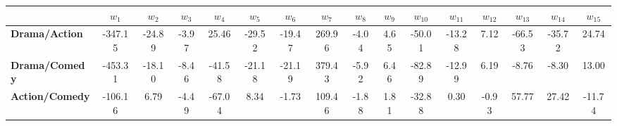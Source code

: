 \begin{tabular}{|l|c|c|c|c|c|c|c|c|c|c|c|c|c|c|c|}
\hline
&\textbf{$w_{1}$}&\textbf{$w_{2}$}&\textbf{$w_{3}$}&\textbf{$w_{4}$}&\textbf{$w_{5}$}&\textbf{$w_{6}$}&\textbf{$w_{7}$}&\textbf{$w_{8}$}&\textbf{$w_{9}$}&\textbf{$w_{10}$}&\textbf{$w_{11}$}&\textbf{$w_{12}$}&\textbf{$w_{13}$}&\textbf{$w_{14}$}&\textbf{$w_{15}$}\\\hline
\textbf{Drama/Action}&-347.15&-24.89&-3.97&25.46&-29.52&-19.47&269.96&-4.04&4.65&-50.01&-13.28&7.12&-66.53&-35.72&24.74\\\hline
\textbf{Drama/Comedy}&-453.31&-18.10&-8.46&-41.58&-21.18&-21.19&379.43&-5.92&6.46&-82.89&-12.99&6.19&-8.76&-8.30&13.00\\\hline
\textbf{Action/Comedy}&-106.16&6.79&-4.49&-67.04&8.34&-1.73&109.46&-1.88&1.81&-32.88&0.30&-0.93&57.77&27.42&-11.74\\\hline
\end{tabular}

